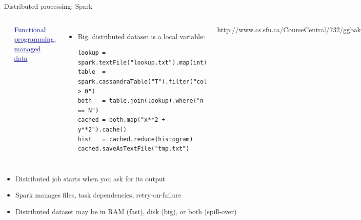 \documentclass[aspectratio=169]{beamer}
\begin{document}
\begin{frame}[fragile]{Distributed processing: Spark}
\vspace{0.5 cm}
\begin{columns}[b]
\includegraphics[height=1.5 cm]{spark-logo.png}

\textcolor{darkblue}{\Large \underline{Functional programming, managed data}}

\large
\vspace{0.25 cm}
\begin{itemize}
\item Big, distributed dataset is a local variable:

\scriptsize
\begin{verbatim}
lookup = spark.textFile("lookup.txt").map(int)
table  = spark.cassandraTable("T").filter("col > 0")
both   = table.join(lookup).where("n == N")
cached = both.map("x**2 + y**2").cache()
hist   = cached.reduce(histogram)
cached.saveAsTextFile("tmp.txt")
\end{verbatim}
\end{itemize}

\tiny

\textcolor{blue}{\url{http://www.cs.sfu.ca/CourseCentral/732/ggbaker/content/spark.html}}

\vspace{0.2 cm}
\includegraphics[width=\linewidth]{spark-dag.png}
\end{columns}

\large
\begin{itemize}
\item<2-> Distributed job starts when you ask for its output
\item<3-> Spark manages files, task dependencies, retry-on-failure
\item<4-> Distributed dataset may be in RAM (fast), disk (big), or both (spill-over)
\end{itemize}
\end{frame}
\end{document}
